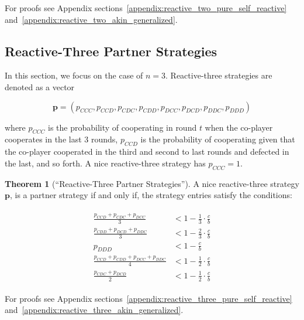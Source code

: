 \documentclass{article}
\theoremstyle{definition}
\newtheorem{theorem}{Theorem}[section]
\begin{document}
For proofs see Appendix sections~\ref{appendix:reactive_two_pure_self_reactive}
and~\ref{appendix:reactive_two_akin_generalized}.


\subsection{Reactive-Three Partner Strategies}\label{section:reactive_three_partner_strategies}

In this section, we focus on the case of $n=3$. Reactive-three strategies are
denoted as a vector 

$$\mathbf{p}=(p_{CCC}, p_{CCD}, p_{CDC}, p_{CDD}, p_{DCC}, p_{DCD}, p_{DDC}, p_{DDD})$$

where $p_{CCC}$ is the probability of cooperating in round $t$ when the
co-player cooperates in the last 3 rounds, $p_{CCD}$ is the probability of
cooperating given that the co-player cooperated in the third and second to last
rounds and defected in the last, and so forth. A nice reactive-three strategy
has $p_{CCC} = 1$.

\begin{theorem}[``Reactive-Three Partner Strategies'']\label{theorem:reactive_three_partner_strategies}
A nice reactive-three strategy $\mathbf{p}$, is a partner strategy if and only if,
the strategy entries satisfy the conditions:

\begin{align}\label{eq:three_bit_conditions}
  \begin{split}
  \frac{p_{CCD} + p_{CDC} + p_{DCC}}{3} & < 1\!-\! \frac{1}{3} \cdot \frac{c}{b} \\
  \frac{p_{CDD} + p_{DCD} + p_{DDC}}{3} & < 1\!-\! \frac{2}{3} \cdot \frac{c}{b} \\
  p_{DDD} & < 1\!-\! \frac{c}{b} \\
  \frac{p_{CCD} + p_{CDD} + p_{DCC} + p_{DDC}}{4}  & < 1\!-\! \frac{1}{2} \cdot \frac{c}{b}  \\
  \frac{p_{CDC} + p_{DCD}}{2} & < 1\!-\! \frac{1}{2} \cdot \frac{c}{b}
  \end{split}
\end{align}
\end{theorem}

For proofs see Appendix sections~\ref{appendix:reactive_three_pure_self_reactive}
and~\ref{appendix:reactive_three_akin_generalized}.

\end{document}

